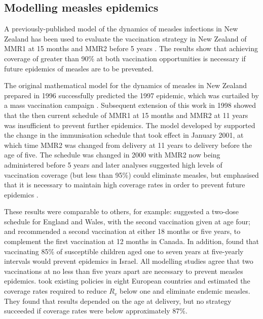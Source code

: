 \documentclass{article}
\begin{document}
\begin{itemize}
\section{Modelling measles epidemics}
\label{sec:epidemic_modelling}

A previously-published model of the dynamics of measles infections in New Zealand has been used to evaluate the vaccination strategy in New Zealand of MMR1 at 15 months and MMR2 before 5 years \citep{roberts0,roberts4,tobias98}. The results show that achieving coverage of greater than 90\% at both vaccination opportunities is necessary if future epidemics of measles are to be prevented.

The original mathematical model for the dynamics of measles in New Zealand prepared in 1996 \citep{tobias98} successfully predicted the 1997 epidemic, which was curtailed by a mass vaccination campaign \citep{mansoor98,roberts0}. Subsequent extension of this work in 1998 showed that the then current schedule of MMR1 at 15 months and MMR2 at 11 years was insufficient to prevent further epidemics. The model developed by \citep{roberts0} supported the change in the immunisation schedule that took effect in January 2001, at which time MMR2 was changed from delivery at 11 years to delivery before the age of five. The schedule was changed in 2000 with MMR2 now being administered before 5 years \citep{anon2a} and later analyses suggested high levels of vaccination coverage (but less than 95\%) could eliminate measles, but emphasised that it is necessary to maintain high coverage rates in order to prevent future epidemics \citep{roberts4}.

These results were comparable to others, for example: \citep{babad95} suggested a two-dose schedule for England and Wales, with the second vaccination given at age four; and \citep{gay98} recommended a second vaccination at either 18 months or five years, to complement the first vaccination at 12 months in Canada. In addition, \citep{agur93} found that vaccinating 85\% of susceptible children aged one to seven years at five-yearly intervals would prevent epidemics in Israel. All modelling studies agree that two vaccinations at no less than five years apart are necessary to prevent measles epidemics. \citep{wallinga1} took existing policies in eight European countries and estimated the coverage rates required to reduce $R_v$ below one and eliminate endemic measles. They found that results depended on the age at delivery, but no strategy succeeded if coverage rates were below approximately 87\%.


\end{itemize}
\end{document}
